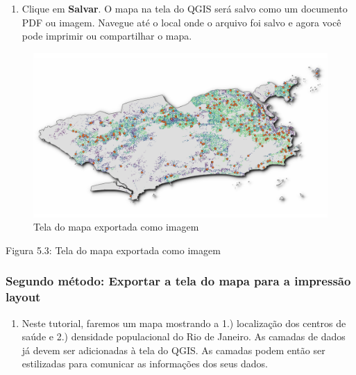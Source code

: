 \documentclass[
]{book}
\providecommand{\tightlist}{%
  \setlength{\itemsep}{0pt}\setlength{\parskip}{0pt}}
\begin{document}
\begin{enumerate}
\def\labelenumi{\arabic{enumi}.}
\setcounter{enumi}{2}
\tightlist
\item
  Clique em \textbf{Salvar}. O mapa na tela do QGIS será salvo como um documento PDF ou imagem. Navegue até o local onde o arquivo foi salvo e agora você pode imprimir ou compartilhar o mapa.
\end{enumerate}

\begin{figure}
\centering
\includegraphics{media/modulo5/exported-map-canvas.png}
\caption{Tela do mapa exportada como imagem}
\end{figure}

Figura 5.3: Tela do mapa exportada como imagem

\hypertarget{segundo-muxe9todo-exportar-a-tela-do-mapa-para-a-impressuxe3o-layout}{%
\subsubsection{\texorpdfstring{\textbf{Segundo método: Exportar a tela do mapa para a impressão layout}}{Segundo método: Exportar a tela do mapa para a impressão layout}}\label{segundo-muxe9todo-exportar-a-tela-do-mapa-para-a-impressuxe3o-layout}}

\begin{enumerate}
\def\labelenumi{\arabic{enumi}.}
\tightlist
\item
  Neste tutorial, faremos um mapa mostrando a 1.) localização dos centros de saúde e 2.) densidade populacional do Rio de Janeiro. As camadas de dados já devem ser adicionadas à tela do QGIS. As camadas podem então ser estilizadas para comunicar as informações dos seus dados.
\end{enumerate}
\end{document}
